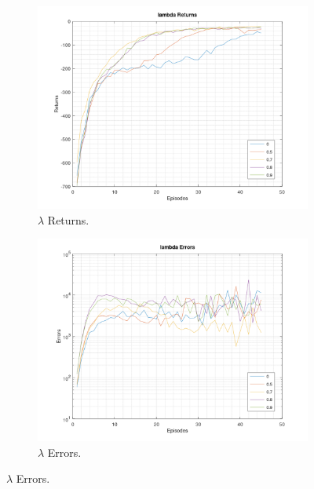 \documentclass[a4paper,11pt]{article}
\begin{document}
\begin{figure}[h!]
	\begin{subfigure}[b]{0.4\linewidth}
		\includegraphics[width=\linewidth]{lambda-returns.png}
		\caption{$\lambda$ Returns.}
	\end{subfigure}
	\begin{subfigure}[b]{0.4\linewidth}
		\includegraphics[width=\linewidth]{lambda-errors.png}
		\caption{$\lambda$ Errors.}
	\end{subfigure}


\end{figure}
\end{document}
